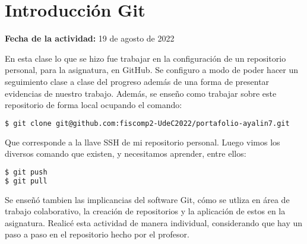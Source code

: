 \documentclass[../portafolio.tex]{subfiles}
\begin{document}


\section{Introducci\'on Git}   %

\hfill \textbf{Fecha de la actividad:} 19 de agosto de 2022

\medskip

En esta clase lo que se hizo fue trabajar en la configuraci\'on de un repositorio personal, para la asignatura, en GitHub. Se configuro a modo de poder hacer un seguimiento clase a clase del progreso adem\'as de una forma de presentar evidencias de nuestro trabajo. Adem\'as, se ense\~no como trabajar sobre este repositorio de forma local ocupando el comando: 
	\begin{lstlisting}[language=bash] 
$ git clone git@github.com:fiscomp2-UdeC2022/portafolio-ayalin7.git
	\end{lstlisting} 
Que corresponde a la llave SSH de mi repositorio personal. Luego vimos los diversos comando que existen, y necesitamos aprender, entre ellos:

\begin{lstlisting}[language=bash]
$ git push 
$ git pull
\end{lstlisting}
Se ense\~n\'o tambien las implicancias del software Git, c\'omo se utliza en \'area de trabajo colaborativo, la creaci\'on de repositorios y la aplicaci\'on de estos en la asignatura.
Realic\'e esta actividad de manera individual, considerando que hay un paso a paso en el repositorio hecho por el profesor. 


\end{document}
